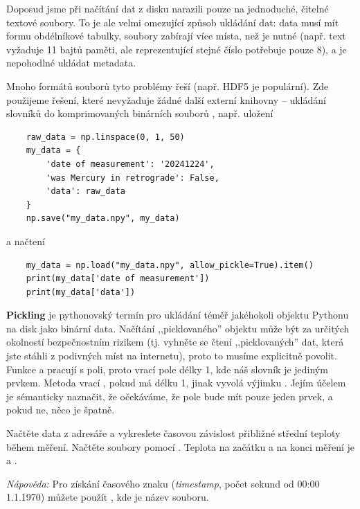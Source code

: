 \begin{syntax}
    \label{syn:npy}
    Doposud jsme při načítání dat z disku narazili pouze na jednoduché, čitelné textové soubory. To je ale velmi omezující způsob ukládání dat: data musí mít formu obdélníkové tabulky, soubory zabírají více místa, než je nutné (např. text  vyžaduje 11 bajtů paměti, ale  reprezentující stejné číslo potřebuje pouze 8), a je nepohodlné ukládat metadata.

    Mnoho formátů souborů tyto problémy řeší (např. HDF5 je populární). Zde použijeme řešení, které nevyžaduje žádné další externí knihovny -- ukládání slovníků do komprimovaných binárních souborů , např. uložení
\begin{lstlisting}
    raw_data = np.linspace(0, 1, 50)
    my_data = {
        'date of measurement': '20241224',
        'was Mercury in retrograde': False,
        'data': raw_data
    }
    np.save("my_data.npy", my_data)
\end{lstlisting}
    a načtení
\begin{lstlisting}
    my_data = np.load("my_data.npy", allow_pickle=True).item()
    print(my_data['date of measurement'])
    print(my_data['data'])
\end{lstlisting}

    \textbf{Pickling} je pythonovský termín pro ukládání téměř jakéhokoli objektu Pythonu na disk jako binární data. Načítání ,,picklovaného'' objektu může být za určitých okolností bezpečnostním rizikem (tj. vyhněte se čtení ,,picklovaných'' dat, která jste stáhli z podivných míst na internetu), proto to musíme explicitně povolit. Funkce  a  pracují s poli, proto  vrací pole délky 1, kde náš slovník je jediným prvkem. Metoda  vrací , pokud má  délku 1, jinak vyvolá výjimku . Jejím účelem je sémanticky naznačit, že očekáváme, že pole bude mít pouze jeden prvek, a pokud ne, něco je špatně.
    
    \begin{exercise}
    Načtěte data z adresáře  a vykreslete časovou závislost přibližné střední teploty během měření. Načtěte soubory pomocí . Teplota na začátku a na konci měření je  a .
    
    \emph{Nápověda:} Pro získání časového znaku (\emph{timestamp}, počet sekund od 00:00 1.1.1970) můžete použít , kde  je název souboru.
\end{exercise}
\end{syntax}

